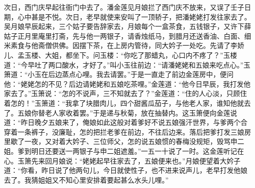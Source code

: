 次日，西门庆早起往衙门中去了。潘金莲见月娘拦了西门庆不放来，又误了壬子日期，心中甚是不悦。次日，老早就使来安叫了一顶轿子，把潘姥姥打发往家去了。吴月娘早辰起来，三个姑子要告辞家去，月娘每个一盒茶食，五钱银子，又许下薛姑子正月里庵里打斋，先与他一两银子，请香烛纸马，到腊月还送香油、白面、细米素食与他斋僧供佛。因摆下茶，在上房内管待，同大妗子一处吃。先请了李娇儿、孟玉楼、大姐，都坐下。问玉楼：“你吃了那蜡丸，心口内不疼了？”玉楼道：“今早吐了两口酸水，才好了。”叫小玉往前边：“请潘姥姥和五娘来吃点心。”玉箫道：“小玉在后边蒸点心哩。我去请罢。”于是一直走了前边金莲房中，便问他：“姥姥怎的不见？后边请姥姥和五娘吃茶哩。”金莲道：“他今日早辰，我打发他家去了。”玉箫说：“怎的不说声，三不知就去了？”金莲道：“住的人心淡，只顾住着怎的！”玉箫道：“我拿了块腊肉儿，四个甜酱瓜茄子，与他老人家，谁知他就去了。五娘你替老人家收着罢。”于是递与秋菊，放在抽替内。这玉箫便向金莲说道：“昨日晚夕五娘来了，俺娘如此这般对着爹好不说五娘强汗世界，与爹两个合穿着一条裤子，没廉耻，怎的把拦老爹在前边，不往后边来。落后把爹打发三娘房里歇了一夜，又对着大妗子、三位师父，怎的说五娘惯的春梅没规矩，毁骂申二姐。爹到明日还要送一两银子与申二姐遮羞。”一五一十说了一时。这金莲听记在心。玉箫先来回月娘说：“姥姥起早往家去了，五娘便来也。”月娘便望着大妗子道：“你看，昨日说了他两句儿，今日就使性子，也不进来说声儿，老早打发他娘去了。我猜姐姐又不知心里安排着要起甚么水头儿哩。”

